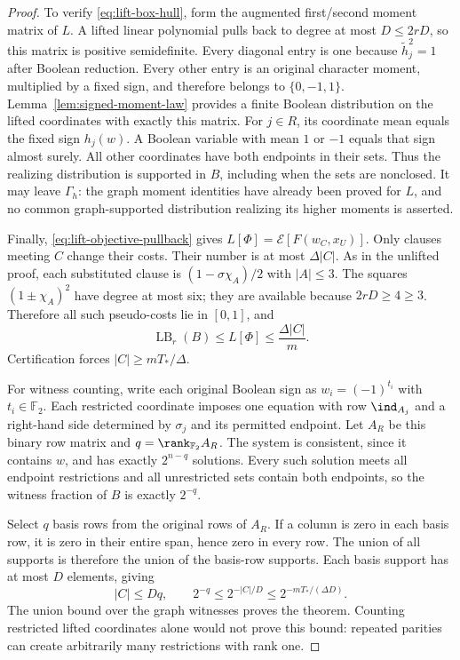 \begin{proof}
To verify \eqref{eq:lift-box-hull}, form the augmented first/second moment
matrix of $L$. A lifted linear polynomial pulls back to degree at most
$D\le2rD$, so this matrix is positive semidefinite. Every diagonal entry
is one because $\widetilde h_j^2=1$ after Boolean reduction. Every other
entry is an original character moment, multiplied by a fixed sign, and
therefore belongs to $\{0,-1,1\}$. Lemma~\ref{lem:signed-moment-law}
provides a finite Boolean distribution on the lifted coordinates with
exactly this matrix. For $j\in R$, its coordinate mean equals the fixed
sign $h_j(w)$. A Boolean variable with mean $1$ or $-1$ equals that sign
almost surely. All other coordinates have both endpoints in their sets.
Thus the realizing distribution is supported in $B$, including when the
sets are nonclosed. It may leave $\Gamma_h$: the graph moment identities
have already been proved for $L$, and no common graph-supported
distribution realizing its higher moments is asserted.

Finally, \eqref{eq:lift-objective-pullback} gives
$L[\Phi]=\mathcal E[F(w_C,x_U)]$. Only clauses meeting $C$ change their
costs. Their number is at most $\Delta|C|$. As in the unlifted proof,
each substituted clause is $(1-\sigma\chi_A)/2$ with $|A|\le3$.
The squares $(1\pm\chi_A)^2$ have degree at most six; they are available
because $2rD\ge4\ge3$. Therefore all such pseudo-costs lie in $[0,1]$,
and
\begin{equation}\label{eq:lift-cost-restriction}
 \operatorname{LB}_r(B)\le L[\Phi]\le\frac{\Delta|C|}{m}.
\end{equation}
Certification forces $|C|\ge mT_*/\Delta$.

For witness counting, write each original Boolean sign as $w_i=(-1)^{t_i}$
with $t_i\in\mathbb F_2$. Each restricted coordinate imposes one equation
with row $\ind_{A_j}$ and a right-hand side determined by $\sigma_j$ and
its permitted endpoint. Let $A_R$ be this binary row matrix and
$q=\rank_{\mathbb F_2}A_R$. The system is consistent, since it contains
$w$, and has exactly $2^{n-q}$ solutions. Every such solution meets all
endpoint restrictions and all unrestricted sets contain both endpoints,
so the witness fraction of $B$ is exactly $2^{-q}$.

Select $q$ basis rows from the original rows of $A_R$. If a column is zero
in each basis row, it is zero in their entire span, hence zero in every
row. The union of all supports is therefore the union of the basis-row
supports. Each basis support has at most $D$ elements, giving
\begin{equation}\label{eq:parity-rank-support}
 |C|\le Dq,\qquad
 2^{-q}\le2^{-|C|/D}\le2^{-mT_*/(\Delta D)}.
\end{equation}
The union bound over the graph witnesses proves the theorem. Counting
restricted lifted coordinates alone would not prove this bound: repeated
parities can create arbitrarily many restrictions with rank one.
\end{proof}

